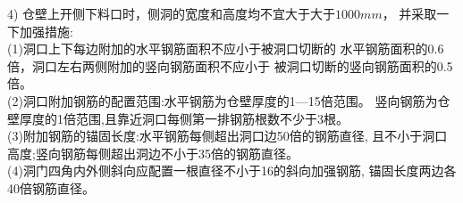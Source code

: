 4) 仓壁上开侧下料口时，侧洞的宽度和高度均不宜大于大于$1000mm$，
	并采取一下加强措施:\\
    (1)洞口上下每边附加的水平钢筋面积不应小于被洞口切断的
	水平钢筋面积的0.6倍，洞口左右两侧附加的竖向钢筋面积不应小于
	被洞口切断的竖向钢筋面积的0.5倍。\\
    (2)洞口附加钢筋的配置范围:水平钢筋为仓壁厚度的1—15倍范围。
	竖向钢筋为仓壁厚度的1倍范围,且靠近洞口每侧第一排钢筋根数不少于3根。\\
    (3)附加钢筋的锚固长度:水平钢筋每侧超出洞口边50倍的钢筋直径,
	且不小于洞口高度;竖向钢筋每侧超出洞边不小于35倍的钢筋直径。\\
    (4)洞门四角内外侧斜向应配置一根直径不小于16的斜向加强钢筋,
	锚固长度两边各40倍钢筋直径。

